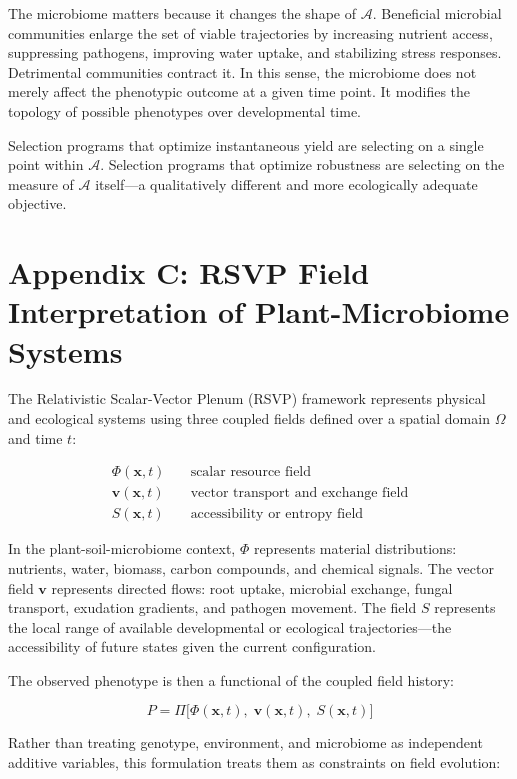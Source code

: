\documentclass[11pt, a4paper]{article}
\begin{document}
The microbiome matters because it changes the shape of $\mathcal{A}$. Beneficial microbial communities enlarge the set of viable trajectories by increasing nutrient access, suppressing pathogens, improving water uptake, and stabilizing stress responses. Detrimental communities contract it. In this sense, the microbiome does not merely affect the phenotypic outcome at a given time point. It modifies the topology of possible phenotypes over developmental time.

Selection programs that optimize instantaneous yield are selecting on a single point within $\mathcal{A}$. Selection programs that optimize robustness are selecting on the measure of $\mathcal{A}$ itself---a qualitatively different and more ecologically adequate objective.

\bigskip
{}
\section*{Appendix C: RSVP Field Interpretation of Plant-Microbiome Systems}

The Relativistic Scalar-Vector Plenum (RSVP) framework represents physical and ecological systems using three coupled fields defined over a spatial domain $\Omega$ and time $t$:

\begin{align*}
\Phi(\mathbf{x},t) &\quad \text{scalar resource field} \\
\mathbf{v}(\mathbf{x},t) &\quad \text{vector transport and exchange field} \\
S(\mathbf{x},t) &\quad \text{accessibility or entropy field}
\end{align*}

In the plant-soil-microbiome context, $\Phi$ represents material distributions: nutrients, water, biomass, carbon compounds, and chemical signals. The vector field $\mathbf{v}$ represents directed flows: root uptake, microbial exchange, fungal transport, exudation gradients, and pathogen movement. The field $S$ represents the local range of available developmental or ecological trajectories---the accessibility of future states given the current configuration.

The observed phenotype is then a functional of the coupled field history:

\[
P = \Pi\bigl[\Phi(\mathbf{x},t),\; \mathbf{v}(\mathbf{x},t),\; S(\mathbf{x},t)\bigr]
\]

Rather than treating genotype, environment, and microbiome as independent additive variables, this formulation treats them as constraints on field evolution:
\end{document}
